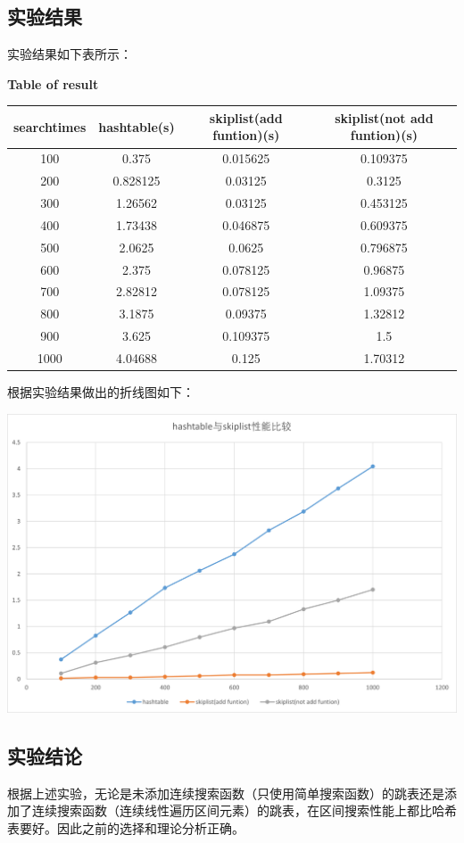 \documentclass[UTF8]{ctexart}
\begin{document}
\subsection{实验结果}
实验结果如下表所示：
\begin{table}[hp]
    \centering
    \textbf{Table of result}
    \begin{tabular}{|c|c|c|c|}
        \hline
        searchtimes& hashtable(s)&	skiplist(add funtion)(s)&	skiplist(not add funtion)(s)\\
        \hline
        100&	0.375&	0.015625&	0.109375\\
        \hline
        200&	0.828125&	0.03125&	0.3125\\
        \hline
        300&	1.26562&	0.03125&	0.453125\\
        \hline
        400&	1.73438&	0.046875&	0.609375\\
        \hline
        500&	2.0625&	0.0625&	0.796875\\
        \hline
        600&	2.375&	0.078125&	0.96875\\
        \hline
        700&	2.82812&	0.078125&	1.09375\\
        \hline
        800&	3.1875&	0.09375&	1.32812\\
        \hline
        900&	3.625&	0.109375&	1.5\\
        \hline
        1000&	4.04688&	0.125&	1.70312\\
        \hline
    \end{tabular}
\end{table}
\newpage
根据实验结果做出的折线图如下：
\begin{center}
    \includegraphics[scale=0.6]{hashtable_and_skiplist.png}
\end{center}
\subsection{实验结论}
根据上述实验，无论是未添加连续搜索函数（只使用简单搜索函数）的跳表还是添加了连续搜索函数（连续线性遍历区间元素）的跳表，在区间搜索性能上都比哈希表要好。因此之前的选择和理论分析正确。


\end{document}
